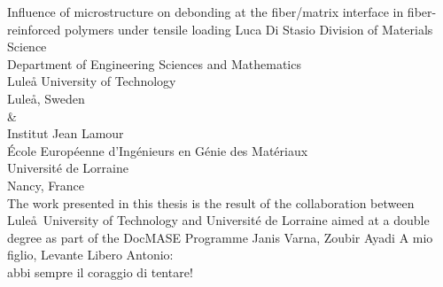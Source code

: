\documentclass[12pt,a4paper,openright,final,twoside]{msethesisul}
\begin{document}
\newrefsection


\def\thesistitle{Influence of microstructure on debonding at the fiber/matrix interface in fiber-reinforced polymers under tensile loading}
\def\theauthor{Luca Di Stasio}
\def\theaddress{Division of Materials Science\\Department of Engineering Sciences and Mathematics\\
Lule{\aa} University of Technology\\ Lule{\aa}, Sweden\\[5pt]\&\\[5pt]Institut Jean Lamour\\\'Ecole Europ\'eenne d'Ing\'enieurs en G\'enie des Mat\'eriaux\\Universit\'e de Lorraine\\Nancy, France\\[10mm]The work presented in this thesis is the result of the collaboration between Lule\aa\ University of Technology and Universit\'e de Lorraine aimed at a double degree as part of the DocMASE Programme}

\def\supervisors{Janis Varna, Zoubir Ayadi}
\def\supervisorstring{Supervisors:} %
\def\dedication{A mio figlio, Levante Libero Antonio:\\ abbi sempre il coraggio di tentare!}

\def\theabstract{}
\def\thepreface{}



\def\thelogo{} %


\startpreamble
  {\thesistitle}
  {\theauthor}
  {\theaddress}
  {\supervisors}
  {\dedication}
  {\theabstract}
  {\thepreface}
  {\thelogo}

\end{document}
